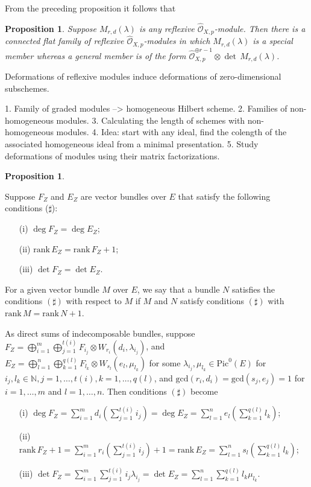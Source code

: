 \documentclass[12pt,oneside,reqno]{amsart}
\newtheorem{prop}[theorem]{Proposition}
\theoremstyle{definition}
\begin{document}
From the preceding proposition it follows that 

\begin{prop}
Suppose $M_{r, d}(\lambda)$ is any reflexive $\hat{\mathcal{O}}_{X, p}$-module. Then there is a connected flat family of reflexive $\hat{\mathcal{O}}_{X, p}$-modules in which $M_{r, d}(\lambda)$ is a special member whereas a general member is of the form $\hat{\mathcal{O}}_{X, p}^{\oplus r - 1} \otimes \det \, M_{r, d}(\lambda)$.
\end{prop}

Deformations of reflexive modules induce deformations of zero-dimensional subschemes. 

1. Family of graded modules --> homogeneous Hilbert scheme.
2. Families of non-homogeneous modules.
3. Calculating the length of schemes with non-homogeneous modules.
4. Idea: start with any ideal, find the colength of the associated homogeneous ideal from a minimal presentation.
5. Study deformations of modules using their matrix factorizations. 

\begin{prop}

\end{prop}







Suppose $F_Z$ and $E_Z$ are vector bundles over $E$ that satisfy the following conditions ($\sharp$): 
\begin{itemize}
\item[(i)] $\deg F_Z = \deg E_Z$;
\item[(ii)] $\mathrm{rank} \, E_Z = \mathrm{rank} \, F_Z + 1$;
\item[(iii)] $\det F_Z = \det E_Z$.
\end{itemize}

For a given vector bundle $M$ over $E$, we say that a bundle $N$ satisfies the conditions $(\sharp)$ with respect to $M$ if $M$ and $N$ satisfy conditions $(\sharp)$ with $\mathrm{rank} \, M = \mathrm{rank} \, N + 1$. 

As direct sums of indecomposable bundles, suppose $F_Z = \bigoplus_{i = 1}^{m} \bigoplus_{j = 1}^{t(i)}F_{i_j} \otimes W_{r_i}(d_i, \lambda_{i_j})$, and $E_Z = \bigoplus_{l = 1}^{n} \bigoplus_{k = 1}^{q(l)}F_{l_k} \otimes W_{s_l}(e_l, \mu_{l_k})$ for some $\lambda_{i_j}, \mu_{l_k} \in \mathrm{Pic}^0(E)$ for $i_j, l_k \in \mathbb{N}, j = 1, \dots, t(i), k = 1, \dots, q(l)$, and $\mathrm{gcd}(r_i, d_i) = \mathrm{gcd}(s_j, e_j) = 1$ for $i = 1, \dots, m$ and $l = 1, \dots, n$. Then conditions $(\sharp)$ become
\begin{itemize}
\item[(i)] $\deg F_Z = \sum_{i = 1}^m d_i(\sum_{j = 1}^{t(i)} i_j) = \deg E_Z = \sum_{l = 1}^n e_l(\sum_{k = 1}^{q(l)} l_k)$;
\item[(ii)] $\mathrm{rank} \, F_Z + 1 = \sum_{i = 1}^mr_i (\sum_{j = 1}^{t(i)} i_j) + 1 = \mathrm{rank} \, E_Z = \sum_{l = 1}^ns_l (\sum_{k = 1}^{q(l)} l_k)$;
\item[(iii)] $\det F_Z = \sum_{i = 1}^m \sum_{j = 1}^{t(i)}i_j\lambda_{i_j} = \det E_Z = \sum_{l = 1}^n \sum_{k = 1}^{q(l)}l_k\mu_{l_k} $.
\end{itemize}
\end{document}
